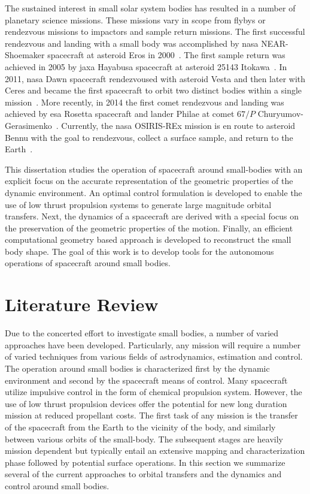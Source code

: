 The sustained interest in small solar system bodies has resulted in a number of planetary science missions.
These missions vary in scope from flybys or rendezvous missions to impactors and sample return missions. 
The first successful rendezvous and landing with a small body was accomplished by \gls{nasa} NEAR-Shoemaker spacecraft at asteroid Eros in \num{2000}~\cite{miller2002}.
The first sample return was achieved in \num{2005} by \gls{jaxa} Hayabusa spacecraft at asteroid 25143 Itokawa~\cite{yoshimitsu2009}.
In \num{2011}, \gls{nasa} Dawn spacecraft rendezvoused with asteroid  Vesta and then later with Ceres and became the first spacecraft to orbit two distinct bodies within a single mission~\cite{rayman2006}.
More recently, in \num{2014} the first comet rendezvous and landing was achieved by \gls{esa} Rosetta spacecraft and lander Philae at comet \(67/P\) Churyumov-Gerasimenko~\cite{bibring2015}.
Currently, the \gls{nasa} OSIRIS-REx mission is en route to asteroid Bennu with the goal to rendezvous, collect a surface sample, and return to the Earth~\cite{beshore2015}.

This dissertation studies the operation of spacecraft around small-bodies with an explicit focus on the accurate representation of the geometric properties of the dynamic environment.
An optimal control formulation is developed to enable the use of low thrust propulsion systems to generate large magnitude orbital transfers.
Next, the dynamics of a spacecraft are derived with a special focus on the preservation of the geometric properties of the motion.
Finally, an efficient computational geometry based approach is developed to reconstruct the small body shape.
The goal of this work is to develop tools for the autonomous operations of spacecraft around small bodies.

\section{Literature Review}

Due to the concerted effort to investigate small bodies, a number of varied approaches have been developed.
Particularly, any mission will require a number of varied techniques from various fields of astrodynamics, estimation and control. 
The operation around small bodies is characterized first by the dynamic environment and second by the spacecraft means of control. 
Many spacecraft utilize impulsive control in the form of chemical propulsion system.
However, the use of low thrust propulsion devices offer the potential for new long duration mission at reduced propellant costs.
The first task of any mission is the transfer of the spacecraft from the Earth to the vicinity of the body, and similarly between various orbits of the small-body. 
The subsequent stages are heavily mission dependent but typically entail an extensive mapping and characterization phase followed by potential surface operations.
In this section we summarize several of the current approaches to orbital transfers and the dynamics and  control around small bodies.

